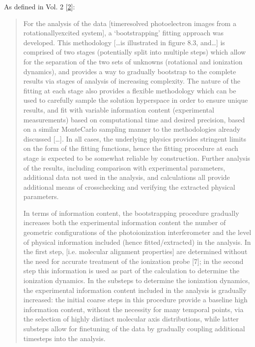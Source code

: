 \documentclass[letterpaper,table,10pt,english]{jupyterBook}
\begin{document}
\sphinxAtStartPar
As defined in  Vol. 2 {[}\hyperlink{cite.backmatter/bibliography:id570}{2}{]}:
\begin{quote}

\sphinxAtStartPar
For the analysis of the data {[}time\sphinxhyphen{}resolved photoelectron images from a rotationally\sphinxhyphen{}excited system{]}, a ‘bootstrapping’ fitting approach was developed. This methodology {[}…is illustrated in figure 8.3, and…{]} is comprised of two stages (potentially split into multiple steps) which allow for the separation of the two sets of unknowns (rotational and ionization dynamics), and provides a way to gradually bootstrap to the complete {\hyperref[\detokenize{backmatter/glossary:term-MF}]{}} results via stages of analysis of increasing complexity. The nature of the fitting at each stage also provides a flexible methodology which can be used to carefully sample the solution hyperspace in order to ensure unique results, and fit with variable information content (experimental measurements) based on computational time and desired precision, based on a similar Monte\sphinxhyphen{}Carlo sampling manner to the methodologies already discussed {[}…{]}. In all cases, the underlying physics provides stringent limits on the form of the fitting functions, hence the fitting procedure at each stage is expected to be somewhat reliable by construction. Further analysis of the results, including comparison with experimental parameters, additional data not used in the analysis, and  calculations all provide additional means of cross\sphinxhyphen{}checking and verifying the extracted physical parameters.

\sphinxAtStartPar
In terms of information content, the bootstrapping procedure gradually increases both the experimental information content \sphinxhyphen{} the number of geometric configurations of the photoionization interferometer \sphinxhyphen{} and the level of physical information included (hence fitted/extracted) in the analysis. In the first step, {\hyperref[\detokenize{backmatter/glossary:term-ADMs}]{}} {[}i.e. molecular alignment properties{]} are determined without the need for accurate treatment of the ionization probe {[}7{]}; in the second step this information is used as part of the calculation to determine the ionization dynamics. In the sub\sphinxhyphen{}steps to determine the ionization dynamics, the experimental information content included in the analysis is gradually increased: the initial coarse steps in this procedure provide a base\sphinxhyphen{}line high information content, without the necessity for many temporal points, via the selection of highly distinct molecular axis distributions, while latter sub\sphinxhyphen{}steps allow for fine\sphinxhyphen{}tuning of the data by gradually coupling additional time\sphinxhyphen{}steps into the analysis.


\end{quote}
\end{document}
